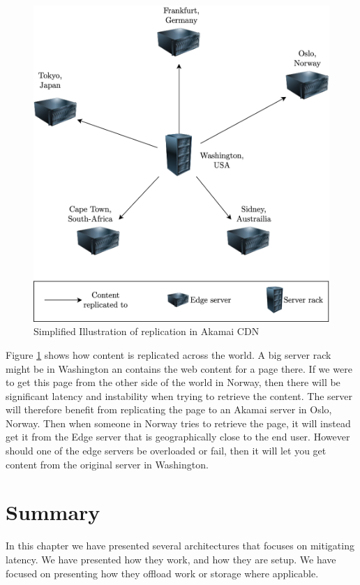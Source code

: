 \begin{figure}[t]
    \centering
    \includegraphics[scale=0.8]{chapters/architectures/figures/akamai_dist.png}
    \caption{Simplified Illustration of replication in Akamai CDN}
    \label{fig:Akamai_cdn}
\end{figure}

Figure \ref{fig:Akamai_cdn} shows how content is replicated across the world. A big server rack might be in Washington an contains the web content for a page there. If we were to get this page from the other side of the world in Norway, then there will be significant latency and instability when trying to retrieve the content. The server will therefore benefit from replicating the page to an Akamai server in Oslo, Norway. Then when someone in Norway tries to retrieve the page, it will instead get it from the Edge server that is geographically close to the end user. However should one of the edge servers be overloaded or fail, then it will let you get content from the original server in Washington. 




\section{Summary}
In this chapter we have presented several architectures that focuses on mitigating latency. We have presented how they work, and how they are setup. We have focused on presenting how they offload work or storage where applicable. 